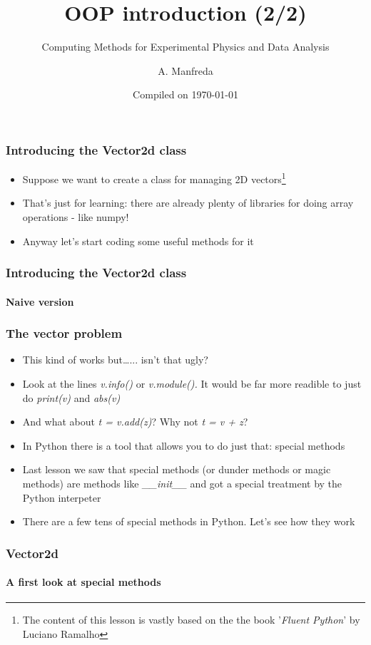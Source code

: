 \documentclass[9pt]{beamer}
\title{OOP introduction (2/2)}
\subtitle{Computing Methods for Experimental Physics and Data Analysis}
\date{Compiled on \today}
\author{A. Manfreda}
\institute[INFN]{INFN--Pisa}
\begin{document}
\titleframe


\begin{frame}
  \frametitle{Introducing the Vector2d class}
  
  \begin{itemize}
    \item Suppose we want to create a class for managing 2D vectors\footnote{%
      The content of this lesson is vastly based on the the book '\emph{Fluent Python}' by Luciano Ramalho}
    \bigskip
    \item That's just for learning: there are already plenty of libraries for
          doing array operations - like numpy!
    \bigskip
    \item Anyway let's start coding some useful methods for it
  \end{itemize}
  
\end{frame}


\begin{frame}
  \frametitle{Introducing the Vector2d class}
  \framesubtitle{Naive version}
  
\end{frame}


\begin{frame}
  \frametitle{The vector problem}
  
  \begin{itemize}
    \item This kind of works but\dots... isn't that ugly?
    \medskip
    \item Look at the lines \emph{v.info()} or \emph{v.module().}
          It would be far more readible to just do \emph{print(v)} and \emph{abs(v)}
    \medskip
    \item And what about \emph{t = v.add(z)}? Why not \emph{t = v + z}?
    \medskip
    \item In Python there is a tool that allows you to do just that: \alert{special methods}
    \medskip
    \item Last lesson we saw that special methods (or dunder methods or 
          magic methods) are methods like \emph{\_\_init\_\_} and got a special
          treatment by the Python interpeter
    \medskip
    \item There are a few tens of special methods in Python. Let's see how they work
  \end{itemize}
  
\end{frame}

  
\begin{frame}
  \frametitle{Vector2d}
  \framesubtitle{A first look at special methods}
  
\end{frame}
\end{document}
